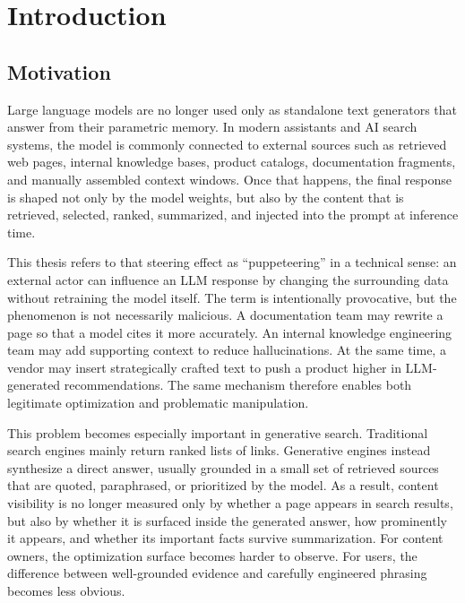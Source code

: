 
\chapter{Introduction}\label{cap:intro}

\section{Motivation}\label{sect:motivation}

Large language models are no longer used only as standalone text generators that answer from
their parametric memory. In modern assistants and AI search systems, the model is commonly
connected to external sources such as retrieved web pages, internal knowledge bases, product
catalogs, documentation fragments, and manually assembled context windows. Once that
happens, the final response is shaped not only by the model weights, but also by the content
that is retrieved, selected, ranked, summarized, and injected into the prompt at inference time.

This thesis refers to that steering effect as ``puppeteering'' in a technical sense: an external
actor can influence an LLM response by changing the surrounding data without retraining the
model itself. The term is intentionally provocative, but the phenomenon is not necessarily
malicious. A documentation team may rewrite a page so that a model cites it more accurately.
An internal knowledge engineering team may add supporting context to reduce hallucinations.
At the same time, a vendor may insert strategically crafted text to push a product higher in
LLM-generated recommendations. The same mechanism therefore enables both legitimate
optimization and problematic manipulation.

This problem becomes especially important in generative search. Traditional search engines
mainly return ranked lists of links. Generative engines instead synthesize a direct answer,
usually grounded in a small set of retrieved sources that are quoted, paraphrased, or
prioritized by the model. As a result, content visibility is no longer measured only by whether a
page appears in search results, but also by whether it is surfaced inside the generated answer,
how prominently it appears, and whether its important facts survive summarization. For
content owners, the optimization surface becomes harder to observe. For users, the difference
between well-grounded evidence and carefully engineered phrasing becomes less obvious.

